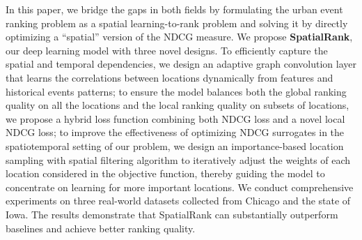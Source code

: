 \documentclass{article}
\begin{document}
In this paper, we bridge the gaps in both fields by formulating the urban event ranking problem as a spatial learning-to-rank problem and solving it by directly optimizing a ``spatial'' version of the NDCG measure. We propose \textbf{SpatialRank}, our deep learning model with three novel designs. To efficiently capture the spatial and temporal dependencies, we design an adaptive graph convolution layer that learns the correlations between locations dynamically from features and historical events patterns; to ensure the model balances both the global ranking quality on all the locations and the local ranking quality on subsets of locations, we propose a hybrid loss function combining both NDCG loss and a novel local NDCG loss; to improve the effectiveness of optimizing NDCG surrogates in the spatiotemporal setting of our problem, we design an importance-based location sampling with spatial filtering algorithm to iteratively adjust the weights of each location considered in the objective function, thereby guiding the model to concentrate on learning for more important locations. We conduct comprehensive experiments on three real-world datasets collected from Chicago and the state of Iowa. The results demonstrate that SpatialRank can substantially outperform baselines and achieve better ranking quality.
\end{document}
